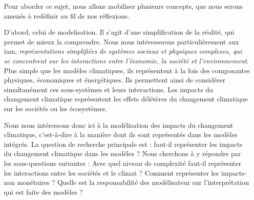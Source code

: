 Pour aborder ce sujet, nous allons mobiliser plusieurs concepts, que nous serons amenés à redéfinir au fil de nos réflexions. 


D'abord, celui de \gls{modelisation}. Il s'agit d'une simplification de la réalité, qui permet de mieux la comprendre. Nous nous intéresserons particulièrement aux \gls{iam}, \textit{représentations simplifiées de systèmes sociaux et physiques complexes, qui se concentrent sur les interactions entre l'économie, la société et l'environnement}. Plus simple que les modèles climatiques, ils représentent à la fois des composantes physiques, économiques et énergétiques. Ils permettent ainsi de considérer simultanément ces sous-systèmes et leurs interactions. Les impacts du changement climatique représentent les effets délétères du changement climatique sur les sociétés ou les écosystèmes. 





Nous nous intéressons donc ici à la modélisation des impacts du changement climatique, c'est-à-dire à la manière dont ils sont représentés dans les modèles intégrés. La question de recherche principale est : faut-il représenter les impacts du changement climatique dans les modèles ? Nous cherchons à y répondre par les sous-questions suivantes : Avec quel niveau de complexité faut-il représenter les interactions entre les sociétés et le climat ? Comment représenter les impacts-non monétaires ? Quelle est la responsabilité des modélisateur sur l'interprétation qui est faite des modèles ?  \\


